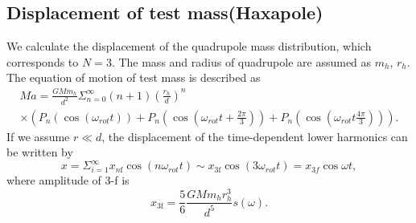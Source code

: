 \documentclass[12pt]{iopart}
\begin{document}
\subsection{Displacement of test mass(Haxapole)} \label{Hexa}
We calculate the displacement of the quadrupole mass distribution, which corresponds to $N=3$.
The mass and radius of quadrupole are assumed as $m_h$, $r_h$. 
The equation of motion of test mass is described as
\begin{eqnarray}
Ma = \frac{GMm_h}{d^2}\Sigma^{\infty}_{n=0}(n+1) \left( \frac{r_h}{d} \right)^n \\
\times \left( P_n\left(\cos{\left(\omega_{rot} t \right)}\right) + P_n\left(\cos{\left(\omega_{rot} t+\frac{2\pi}{3} \right)} \right) + P_n\left(\cos{\left(\omega_{rot} t \frac{4\pi}{3} \right) }\right) \right).
\end{eqnarray} 
If we assume $r \ll d$, the displacement of the time-dependent lower harmonics can be written by 
\begin{equation}
x=\Sigma_{i=1}^{\infty}x_{n\mathrm{f}}\cos(n\omega_{rot} t)\sim  x_{3\mathrm{f}}\cos(3\omega_{rot} t)=x_{3f}\cos{\omega t},
\end{equation}
where amplitude of 3-f is
\begin{equation}
 x_{3\mathrm{f}}=\frac{5}{6}\frac{GMm_{h}r_{h}^3}{d^5}s(\omega). \label{3f}
\end{equation}
\end{document}
